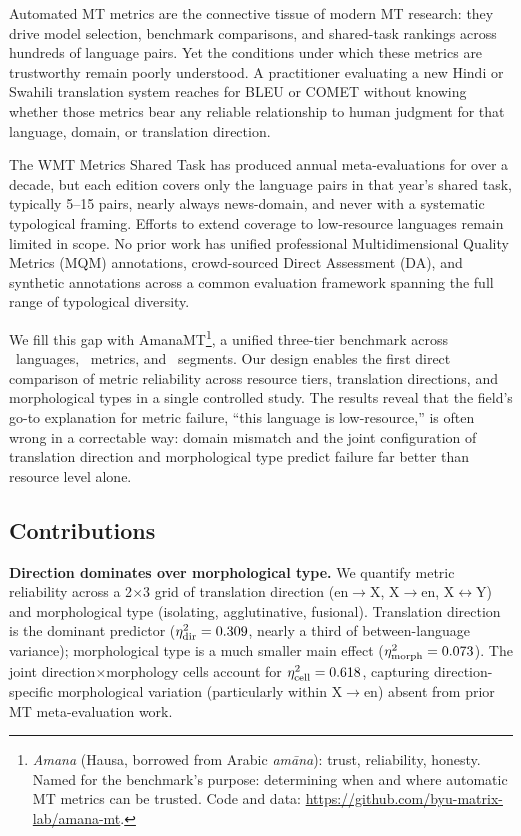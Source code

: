 \documentclass[11pt]{article}
\begin{document}
Automated MT metrics are the connective tissue of modern MT research: they drive model selection, benchmark comparisons, and shared-task rankings across hundreds of language pairs. Yet the conditions under which these metrics are trustworthy remain poorly understood. A practitioner evaluating a new Hindi or Swahili translation system reaches for BLEU or COMET without knowing whether those metrics bear any reliable relationship to human judgment for that language, domain, or translation direction.

The WMT Metrics Shared Task \cite{freitag2023results} has produced annual meta-evaluations for over a decade, but each edition covers only the language pairs in that year's shared task, typically 5--15 pairs, nearly always news-domain, and never with a systematic typological framing. Efforts to extend coverage to low-resource languages \cite{yari2025item} remain limited in scope. No prior work has unified professional Multidimensional Quality Metrics (MQM) annotations, crowd-sourced Direct Assessment (DA), and synthetic annotations across a common evaluation framework spanning the full range of typological diversity.

We fill this gap with AmanaMT\footnote{\emph{Amana} (Hausa, borrowed from Arabic \emph{am\=ana}): trust, reliability, honesty. Named for the benchmark's purpose: determining when and where automatic MT metrics can be trusted. Code and data: \url{https://github.com/byu-matrix-lab/amana-mt}.}, a unified three-tier benchmark across \NumLanguages\ languages, \NumMetrics\ metrics, and \TotalSegments\ segments. Our design enables the first direct comparison of metric reliability across resource tiers, translation directions, and morphological types in a single controlled study. The results reveal that the field's go-to explanation for metric failure, ``this language is low-resource,'' is often wrong in a correctable way: domain mismatch and the joint configuration of translation direction and morphological type predict failure far better than resource level alone.

\subsection{Contributions}

\textbf{Direction dominates over morphological type.} We quantify metric reliability across a 2$\times$3 grid of translation direction (en$\to$X, X$\to$en, X$\leftrightarrow$Y) and morphological type (isolating, agglutinative, fusional). Translation direction is the dominant predictor ($\eta^2_{\text{dir}}=0.309$, nearly a third of between-language variance); morphological type is a much smaller main effect ($\eta^2_{\text{morph}}=0.073$). The joint direction$\times$morphology cells account for $\eta^2_{\text{cell}}=0.618$, capturing direction-specific morphological variation (particularly within X$\to$en) absent from prior MT meta-evaluation work.
\end{document}
